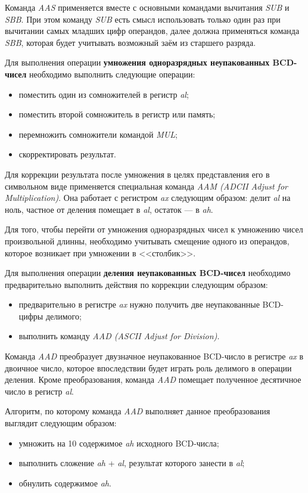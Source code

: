 Команда \textit{AAS} применяется вместе с основными командами вычитания \textit{SUB} и \textit{SBB}.
При этом команду \textit{SUB} есть смысл использовать только один раз при вычитании самых
младших цифр операндов, далее должна применяться команда \textit{SBB}, которая будет учитывать
возможный заём из старшего разряда.

Для выполнения операции \textbf{умножения одноразрядных неупакованных BCD-чисел} необходимо
выполнить следующие операции:
\begin{itemize}
  \item поместить один из сомножителей в регистр \textit{al};
  \item поместить второй сомножитель в регистр или память;
  \item перемножить сомножители командой \textit{MUL};
  \item скорректировать результат.
\end{itemize}

Для коррекции результата после умножения в целях представления его в символьном виде
применяется специальная команда \textit{AAM (ADCII Adjust for Multiplication)}. Она
работает с регистром \textit{ax} следующим образом: делит \textit{al} на ноль, частное
от деления помещает в \textit{al}, остаток --- в \textit{ah}.

Для того, чтобы перейти от умножения одноразрядных чисел к умножению чисел произвольной
длинны, необходимо учитывать смещение одного из операндов, которое возникает при
умножении в <<столбик>>.

Для выполнения операции \textbf{деления неупакованных BCD-чисел} необходимо предварительно
выполнить действия по коррекции следующим образом:
\begin{itemize}
  \item предварительно в регистре \textit{ax} нужно получить две неупакованные
    BCD-цифры делимого;
  \item выполнить команду \textit{AAD (ASCII Adjust for Division)}.
\end{itemize}

Команда \textit{AAD} преобразует двузначное неупакованное BCD-число в регистре \textit{ax}
в двоичное число, которое впоследствии будет играть роль делимого в операции деления.
Кроме преобразования, команда \textit{AAD} помещает полученное десятичное число в регистр \textit{al}.

Алгоритм, по которому команда \textit{AAD} выполняет данное преобразования выглядит следующим образом:
\begin{itemize}
  \item умножить на 10 содержимое \textit{ah} исходного BCD-числа;
  \item выполнить сложение \textit{ah} + \textit{al}, результат которого занести в \textit{al};
  \item обнулить содержимое \textit{ah}.
\end{itemize}

